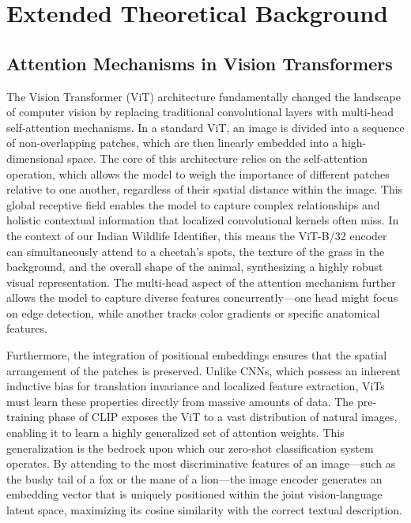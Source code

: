 \documentclass[11pt]{article}
\begin{document}
\section{Extended Theoretical Background}
\subsection{Attention Mechanisms in Vision Transformers}
The Vision Transformer (ViT) architecture fundamentally changed the landscape of computer vision by replacing traditional convolutional layers with multi-head self-attention mechanisms. In a standard ViT, an image is divided into a sequence of non-overlapping patches, which are then linearly embedded into a high-dimensional space. The core of this architecture relies on the self-attention operation, which allows the model to weigh the importance of different patches relative to one another, regardless of their spatial distance within the image. This global receptive field enables the model to capture complex relationships and holistic contextual information that localized convolutional kernels often miss. In the context of our Indian Wildlife Identifier, this means the ViT-B/32 encoder can simultaneously attend to a cheetah's spots, the texture of the grass in the background, and the overall shape of the animal, synthesizing a highly robust visual representation. The multi-head aspect of the attention mechanism further allows the model to capture diverse features concurrently—one head might focus on edge detection, while another tracks color gradients or specific anatomical features.

Furthermore, the integration of positional embeddings ensures that the spatial arrangement of the patches is preserved. Unlike CNNs, which possess an inherent inductive bias for translation invariance and localized feature extraction, ViTs must learn these properties directly from massive amounts of data. The pre-training phase of CLIP exposes the ViT to a vast distribution of natural images, enabling it to learn a highly generalized set of attention weights. This generalization is the bedrock upon which our zero-shot classification system operates. By attending to the most discriminative features of an image—such as the bushy tail of a fox or the mane of a lion—the image encoder generates an embedding vector that is uniquely positioned within the joint vision-language latent space, maximizing its cosine similarity with the correct textual description.
\end{document}
